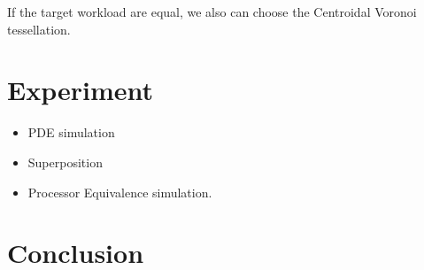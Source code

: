 \documentclass[preprint,12pt]{elsarticle}
\begin{document}
If the target workload are equal, we also can choose the Centroidal Voronoi tessellation.


\section{Experiment}

\begin{itemize}
\item PDE simulation
\item Superposition
\item Processor Equivalence simulation.
\end{itemize}

\section{Conclusion}














\end{document}
